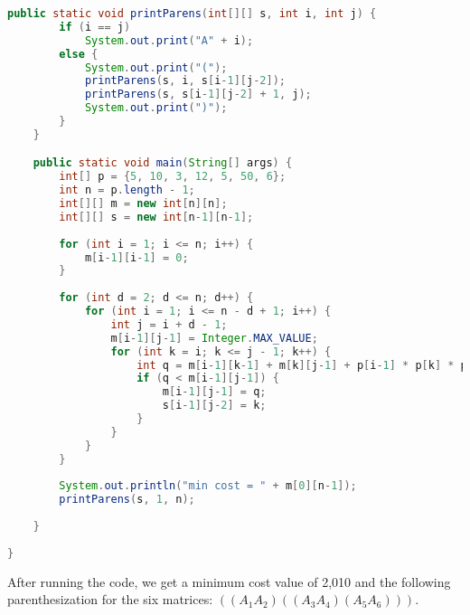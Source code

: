 \documentclass{article}
\begin{document}
\begin{enumerate}[1.]
\begin{lstlisting}[language=Java]
	public static void printParens(int[][] s, int i, int j) {
		if (i == j)
			System.out.print("A" + i);
		else {
			System.out.print("(");
			printParens(s, i, s[i-1][j-2]);
			printParens(s, s[i-1][j-2] + 1, j);
			System.out.print(")");
		}
	}

	public static void main(String[] args) {
		int[] p = {5, 10, 3, 12, 5, 50, 6};
		int n = p.length - 1;
		int[][] m = new int[n][n];
		int[][] s = new int[n-1][n-1];
		
		for (int i = 1; i <= n; i++) {
			m[i-1][i-1] = 0;
		}
		
		for (int d = 2; d <= n; d++) {
			for (int i = 1; i <= n - d + 1; i++) {
				int j = i + d - 1;
				m[i-1][j-1] = Integer.MAX_VALUE;
				for (int k = i; k <= j - 1; k++) {
					int q = m[i-1][k-1] + m[k][j-1] + p[i-1] * p[k] * p[j];
					if (q < m[i-1][j-1]) {
						m[i-1][j-1] = q;
						s[i-1][j-2] = k;
					}
				}
			}
		}
		
		System.out.println("min cost = " + m[0][n-1]);
		printParens(s, 1, n);
		
	}
	
}

\end{lstlisting}

    After running the code, we get a minimum cost value of 2,010 and the following parenthesization for the six matrices: $((A_1A_2)((A_3A_4)(A_5A_6)))$.
    \newline


\end{enumerate}
\end{document}
